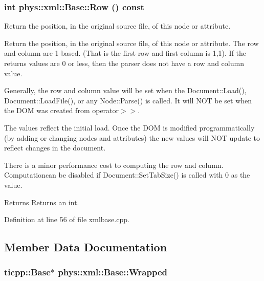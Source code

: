 \hypertarget{classphys_1_1xml_1_1Base_adc2f732f1f37ef7bae5b701a84470754}{
\subsubsection[{Row}]{\setlength{\rightskip}{0pt plus 5cm}int phys::xml::Base::Row () const}}
\label{df/d10/classphys_1_1xml_1_1Base_adc2f732f1f37ef7bae5b701a84470754}


Return the position, in the original source file, of this node or attribute. 

Return the position, in the original source file, of this node or attribute. The row and column are 1-\/based. (That is the first row and first column is 1,1). If the returns values are 0 or less, then the parser does not have a row and column value. \par
 \par
 Generally, the row and column value will be set when the Document::Load(), Document::LoadFile(), or any Node::Parse() is called. It will NOT be set when the DOM was created from operator$>$$>$. \par
 \par
 The values reflect the initial load. Once the DOM is modified programmatically (by adding or changing nodes and attributes) the new values will NOT update to reflect changes in the document. \par
 \par
 There is a minor performance cost to computing the row and column. Computationcan be disabled if Document::SetTabSize() is called with 0 as the value. \begin{DoxyReturn}{Returns}
Returns an int. 
\end{DoxyReturn}


Definition at line 56 of file xmlbase.cpp.



\subsection{Member Data Documentation}
\hypertarget{classphys_1_1xml_1_1Base_a95edc995971b4ed433945a1a8843127e}{
\subsubsection[{Wrapped}]{\setlength{\rightskip}{0pt plus 5cm}ticpp::Base$\ast$ {\bf phys::xml::Base::Wrapped}}}
\label{df/d10/classphys_1_1xml_1_1Base_a95edc995971b4ed433945a1a8843127e}


